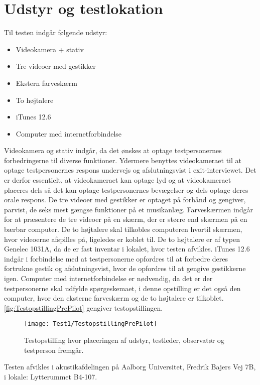 \section{Udstyr og testlokation}
\label{UdstyrOgTestlokationValgAfGestikker}
%
Til testen indgår følgende udstyr:
%
\begin{itemize}
  \item Videokamera + stativ
  \item Tre videoer med gestikker
  \item Ekstern farveskærm 
  \item To højtalere
  \item iTunes 12.6  
  \item Computer med internetforbindelse\blankline
\end{itemize}
% 
Videokamera og stativ indgår, da det ønskes at optage testpersonernes forbedringerne til diverse funktioner. Ydermere benyttes videokameraet til at optage testpersonernes respons undervejs og afslutningsvist i exit-interviewet. Det er derfor essentielt, at videokameraet kan optage lyd og at videokameraet placeres dels så det kan optage testpersonernes bevægelser og dels optage deres orale respons. De tre videoer med gestikker er optaget på forhånd og gengiver, parvist, de seks mest gængse funktioner på et musikanlæg. Farveskærmen indgår for at præsentere de tre videoer på en skærm, der er større end skærmen på en bærbar computer. De to højtalere skal tilkobles computeren hvortil skærmen, hvor videoerne afspilles på, ligeledes er koblet til. De to højtalere er af typen Genelec 1031A, da de er fast inventar i lokalet, hvor testen afvikles. iTunes 12.6 indgår i forbindelse med at testpersonerne opfordres til at forbedre deres fortrukne gestik og afslutningsvist, hvor de opfordres til at gengive gestikkerne igen. Computer med internetforbindelse er nødvendig, da det er der testpersonerne skal udfylde spørgeskemaet, i denne opstilling er det også den computer, hvor den eksterne farveskærm og de to højtalere er tilkoblet. \autoref{fig:TestopstillingPrePilot} gengiver testopstillingen.  
%
\begin{figure}[H]
	\centering
	\texttt{[image: Test1/TestopstillingPrePilot]}
	\caption{Testopstilling hvor placeringen af udstyr, testleder, observatør og testperson fremgår.}
	\label{fig:TestopstillingPrePilot}
\end{figure}
\noindent
% 
Testen afvikles i akustikafdelingen på Aalborg Universitet, Fredrik Bajers Vej 7B, i lokale: Lytterummet B4-107. 
%
